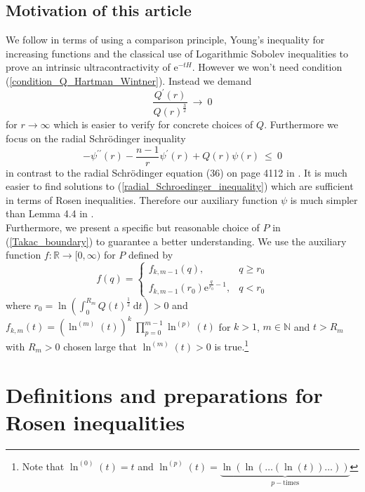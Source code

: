 \documentclass[12pt,longbibliography]{article}
\def\N{\mathbb{N}}
\def\R{\mathbb{R}}
\theoremstyle{definition}
\theoremstyle{remark}
\theoremstyle{example}
\begin{document}
\subsection{Motivation of this article}

We follow \cite{AlziaryTakac09} in terms of using a comparison principle, Young's inequality for increasing functions and
the classical use of Logarithmic Sobolev inequalities to prove an intrinsic ultracontractivity of $\mathrm{e}^{-tH}$. 
However we won't need condition (\ref{condition_Q_Hartman_Wintner}). Instead we demand 
$$
\frac{Q^{\prime}(r)}{Q(r)^{\frac{3}{2}}} \ \to \ 0
$$
for $r \to \infty$ which is easier to verify for concrete choices of $Q$. Furthermore we focus 
on the radial Schrödinger inequality 
\begin{equation}\label{radial_Schroedinger_inequality}
- \psi^{\prime \prime} (r) - \frac{n-1}{r} \psi^{\prime}(r) + Q(r)\psi(r) \ \leq \ 0 
\end{equation}
in contrast to the radial Schrödinger equation (36) on page 4112 in \cite{AlziaryTakac09}. It is much easier to find 
solutions to (\ref{radial_Schroedinger_inequality}) which are sufficient in terms of Rosen inequalities. Therefore
our auxiliary function $\psi$ is much simpler than Lemma 4.4 in \cite{AlziaryTakac09}.\\   
Furthermore, we present a specific but reasonable choice of $P$ in (\ref{Takac_boundary}) to guarantee a better 
understanding. We use the auxiliary function
$f \colon \R \to [0,\infty)$ for $P$ defined by
$$
f(q)=\left\{\begin{array}{ll} 
	f_{k,m-1}(q), & q \geq r_{0} \\
         f_{k,m-1}\left( r_{0} \right)\mathrm{e}^{\frac{q}{r_{0}}-1}, & q < r_{0}
\end{array}\right. 
$$
where $r_{0} = \ln \left( \int_{0}^{R_{m}} Q(t)^{\frac{1}{2}} \ \mathrm{d}t \right) > 0$ and
$
f_{k, m} (t) = \left( \ln^{(m)}(t) \right)^{k} \ \prod_{p=0}^{m-1} \ln^{(p)}(t)
$ 
for $k>1$, $m \in \N$ and $t > R_{m}$ with $R_{m} > 0$ chosen large that $\ln^{(m)}(t) > 0$ is true.\footnote{
Note that $\ln^{(0)}(t) = t$ and $\ln^{(p)}(t) =\underbrace{\ln(\ln(\dots(\ln(t)) \dots))}_{p-\text{times}}$}\\

 

\section{Definitions and preparations for Rosen inequalities}\label{definitions_and_preparations}
\end{document}
